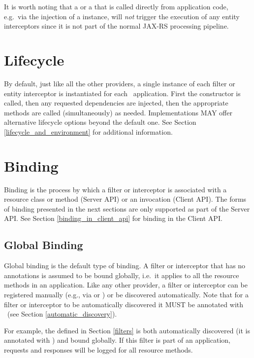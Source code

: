 It is worth noting that a  or a  that is called directly from application code, e.g.~via the injection of a  instance, will \emph{not} trigger the execution of any entity interceptors since it is not part of the normal JAX-RS processing pipeline. 

\section{Lifecycle}

By default, just like all the other providers, a single instance of each filter or entity interceptor is instantiated for each \jaxrs\ application. First the constructor is called, then any requested dependencies are injected, then the appropriate methods are called (simultaneously) as needed. Implementations MAY offer alternative lifecycle options beyond the default one. See Section \ref{lifecycle_and_environment} for additional information.

\section{Binding}

Binding is the process by which a filter or interceptor is associated with a resource class or method (Server API) or an invocation (Client API). The forms of binding presented in the next sections are only supported as part of the Server API. See Section \ref{binding_in_client_api} for binding in the Client API.

\subsection{Global Binding}
\label{global_binding}

Global binding is the default type of binding. A filter or interceptor that has no annotations is assumed to be bound globally, i.e.~it applies to all the resource methods in an application. Like any other provider, a filter or interceptor can be registered manually (e.g., via  or ) or be discovered automatically. Note that for a filter or interceptor to be automatically discovered it MUST be annotated with \Provider\ (see Section \ref{automatic_discovery}). 

For example, the  defined in Section \ref{filters} is both automatically discovered (it is annotated with \Provider) and bound globally. If this filter is part of an application, requests and responses will be logged for all resource methods. 

